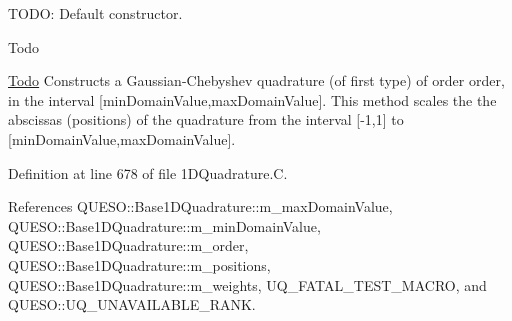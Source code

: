 T\-O\-D\-O\-: Default constructor. 

\begin{DoxyRefDesc}{Todo}
\item[\hyperlink{todo__todo000011}{Todo}]Constructs a Gaussian-\/\-Chebyshev quadrature (of first type) of order {\ttfamily order}, in the interval {\ttfamily \mbox{[}min\-Domain\-Value,max\-Domain\-Value\mbox{]}}. This method scales the the abscissas (positions) of the quadrature from the interval \mbox{[}-\/1,1\mbox{]} to {\ttfamily \mbox{[}min\-Domain\-Value,max\-Domain\-Value\mbox{]}}. \end{DoxyRefDesc}


Definition at line 678 of file 1\-D\-Quadrature.\-C.



References Q\-U\-E\-S\-O\-::\-Base1\-D\-Quadrature\-::m\-\_\-max\-Domain\-Value, Q\-U\-E\-S\-O\-::\-Base1\-D\-Quadrature\-::m\-\_\-min\-Domain\-Value, Q\-U\-E\-S\-O\-::\-Base1\-D\-Quadrature\-::m\-\_\-order, Q\-U\-E\-S\-O\-::\-Base1\-D\-Quadrature\-::m\-\_\-positions, Q\-U\-E\-S\-O\-::\-Base1\-D\-Quadrature\-::m\-\_\-weights, U\-Q\-\_\-\-F\-A\-T\-A\-L\-\_\-\-T\-E\-S\-T\-\_\-\-M\-A\-C\-R\-O, and Q\-U\-E\-S\-O\-::\-U\-Q\-\_\-\-U\-N\-A\-V\-A\-I\-L\-A\-B\-L\-E\-\_\-\-R\-A\-N\-K.


